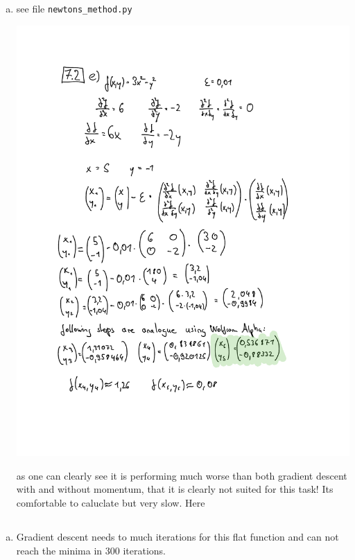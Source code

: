\documentclass[12pt]{article}
\begin{document}
\begin{enumerate}[a)]
    \item
        see file \verb!newtons_method.py!\\
        \begin{center}
            \includegraphics[scale = 0.8]{pictures/calculation}\\
        \end{center}

        as one can clearly see it is performing much worse than both gradient descent with and without momentum, that it is clearly not suited for this task! Its comfortable to caluclate but very slow. Here 

\end{enumerate}


\subsection{ }

\begin{enumerate}[a)]
    \item 
        Gradient descent needs to much iterations for this flat function and can not reach the minima in 300 iterations.

\end{enumerate}
\end{document}
